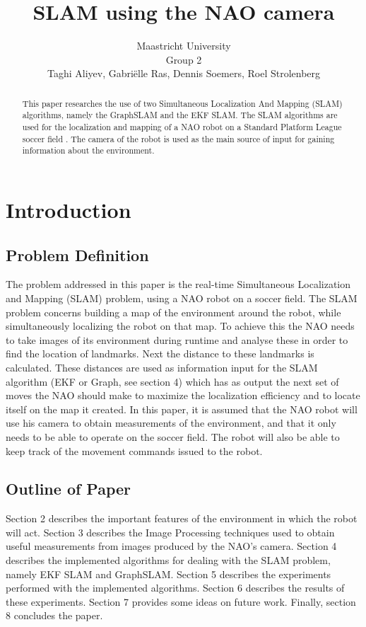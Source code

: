 \documentclass{ba-kecs}
\title{SLAM using the NAO camera}
\author{Maastricht University \\ Group 2 \\ Taghi Aliyev, Gabri\"elle Ras, Dennis Soemers, Roel Strolenberg}
\numberwithin{figure}{section}
\numberwithin{equation}{section}
\begin{document}
\maketitle


\begin{abstract}

This paper researches the use of two Simultaneous Localization And Mapping (SLAM) algorithms, namely the GraphSLAM and the EKF SLAM. The SLAM algorithms are used for the localization and mapping of a NAO robot on a Standard Platform League soccer field \cite{cd1}. The camera of the robot is used as the main source of input for gaining information about the environment.


\end{abstract}


\section{Introduction}


\subsection{Problem Definition}
The problem addressed in this paper is the real-time Simultaneous Localization and Mapping (SLAM) problem, using a NAO robot on a soccer field. The SLAM problem concerns building a map of the environment around the robot, while simultaneously localizing the robot on that map. To achieve this the NAO needs to take images of its environment during runtime and analyse these in order to find the location of landmarks. Next the distance to these landmarks is calculated. These distances are used as information input for the SLAM algorithm (EKF or Graph, see section 4) {\color[rgb]{1,0,0} which has as output the next set of moves the NAO should make to maximize the localization efficiency and to locate itself on the map it created.}
	In this paper, it is assumed that the NAO robot will use his camera to obtain measurements of the environment, and that it only needs to be able to operate on the soccer field. The robot will also be able to keep track of the movement commands issued to the robot.


\subsection{Outline of Paper}
Section 2 describes the important features of the environment in which the robot will act. Section 3 describes the Image Processing techniques used to obtain {\color[rgb]{1,0,0}useful measurements} from images produced by the NAO's camera. Section 4 describes the implemented algorithms for dealing with the SLAM problem, namely EKF SLAM and GraphSLAM.  Section 5 describes the experiments performed with the implemented algorithms. Section 6 describes the results of these experiments. Section 7 provides some ideas on future work. Finally, section 8 concludes the paper.
\end{document}
